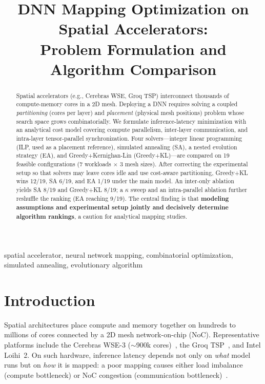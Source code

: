 \documentclass[conference]{IEEEtran}
\begin{document}
\title{DNN Mapping Optimization on Spatial Accelerators:\\
Problem Formulation and Algorithm Comparison}

\author{\IEEEauthorblockN{}
}

\maketitle

\begin{abstract}
Spatial accelerators (e.g., Cerebras WSE, Groq TSP) interconnect thousands of compute-memory cores in a 2D mesh. Deploying a DNN requires solving a coupled \emph{partitioning} (cores per layer) and \emph{placement} (physical mesh positions) problem whose search space grows combinatorially. We formulate inference-latency minimization with an analytical cost model covering compute parallelism, inter-layer communication, and intra-layer tensor-parallel synchronization. Four solvers---integer linear programming (ILP, used as a placement reference), simulated annealing (SA), a nested evolution strategy (EA), and Greedy+Kernighan-Lin (Greedy+KL)---are compared on 19 feasible configurations (7 workloads $\times$ 3 mesh sizes). After correcting the experimental setup so that solvers may leave cores idle and use cost-aware partitioning, Greedy+KL wins 12/19, SA 6/19, and EA 1/19 under the main model. An inter-only ablation yields SA 8/19 and Greedy+KL 8/19; a $\kappa$ sweep and an intra-parallel ablation further reshuffle the ranking (EA reaching 9/19). The central finding is that \textbf{modeling assumptions and experimental setup jointly and decisively determine algorithm rankings}, a caution for analytical mapping studies.
\end{abstract}

\begin{IEEEkeywords}
spatial accelerator, neural network mapping, combinatorial optimization, simulated annealing, evolutionary algorithm
\end{IEEEkeywords}

\section{Introduction}
Spatial architectures place compute and memory together on hundreds to millions of cores connected by a 2D mesh network-on-chip (NoC). Representative platforms include the Cerebras WSE-3 ($\sim$900k cores)~\cite{lie2024}, the Groq TSP~\cite{abts2020}, and Intel Loihi~2. On such hardware, inference latency depends not only on \emph{what} model runs but on \emph{how} it is mapped: a poor mapping causes either load imbalance (compute bottleneck) or NoC congestion (communication bottleneck)~\cite{yik2025,timcheck2026}.
\end{document}
